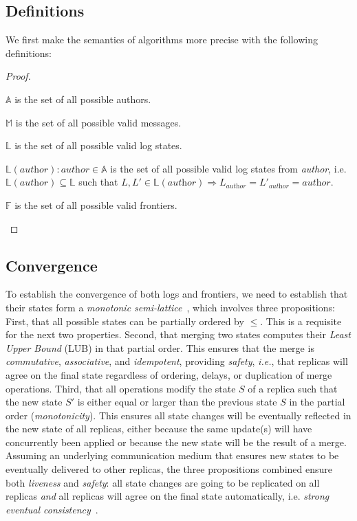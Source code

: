 \documentclass[9pt, oneside]{article}   	%
\begin{document}
\subsection{Definitions}

We first make the semantics of algorithms more precise with the following definitions:
\begin{proof}
	\begin{pfenum}
		\item $\mathds{A}$ is the set of all possible authors.
		\item $\mathds{M}$ is the set of all possible valid messages.
		\item $\mathds{L}$ is the set of all possible valid log states.
		\item $\mathds{L}(\textit{author}) : \textit{author} \in \mathds{A}$ is the set of all possible valid log states from \textit{author}, i.e. $\mathds{L}(\textit{author}) \subseteq \mathds{L}$ such that $L,L' \in \mathds{L}(\textit{author}) \Rightarrow L_\textit{author} = L'_\textit{author} = \textit{author}$.
		\item $\mathds{F}$ is the set of all possible valid frontiers.
	\end{pfenum}
\end{proof}

\subsection{Convergence}

To establish the convergence of both logs and frontiers, we need to establish that their states form a \textit{monotonic semi-lattice}~\cite{shapiro:hal-00932836}, which involves three propositions: First, that all possible states can be partially ordered by $\leq$. This is a requisite for the next two properties. Second, that merging two states computes their \textit{Least Upper Bound} (LUB) in that partial order. This ensures that the merge is \textit{commutative}, \textit{associative}, and \textit{idempotent}, providing \textit{safety}, \textit{i.e.}, that replicas will agree on the final state regardless of ordering, delays, or duplication of merge operations. Third, that all operations modify the state $S$ of a replica such that the new state $S'$ is either equal or larger than the previous state $S$ in the partial order (\textit{monotonicity}). This ensures all state changes will be eventually reflected in the new state of all replicas, either because the same update(s) will have concurrently been applied or because the new state will be the result of a merge. Assuming an underlying communication medium that ensures new states to be eventually delivered to other replicas, the three propositions combined ensure both \textit{liveness} and \textit{safety}: all state changes are going to be replicated on all replicas \textit{and} all replicas will agree on the final state automatically, i.e. \textit{strong eventual consistency}~\cite{shapiro:hal-00932836}.
\end{document}
